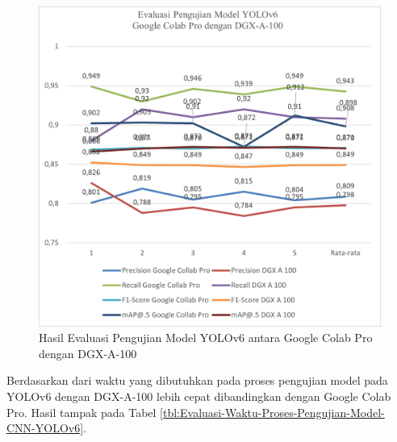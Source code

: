 \begin{figure}[H]
	\vspace{-0.1cm}
	\begin{center}
		\includegraphics[width=1\columnwidth]{bab4/Gambar/Picture30.png}
	\end{center}
	\vspace{-0.2cm}
	\captionsetup{justification=centering}
	\caption{Hasil Evaluasi Pengujian Model YOLOv6 antara Google Colab Pro dengan DGX-A-100}\label{img:Hasil-Evaluasi-Pengujian-Model-YOLOv6-Colab-DGX}
\end{figure}

Berdasarkan dari waktu yang dibutuhkan pada proses pengujian model pada YOLOv6 dengan DGX-A-100 lebih cepat dibandingkan dengan Google Colab Pro. Hasil tampak pada Tabel \ref{tbl:Evaluasi-Waktu-Proses-Pengujian-Model-CNN-YOLOv6}.


